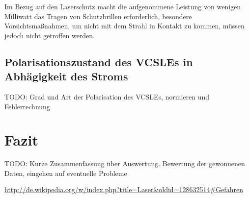 \documentclass[bigchapter,colorback,accentcolor=tud4b,linedtoc,11pt]{tudreport}
\begin{document}
Im Bezug auf den Laserschutz macht die aufgenommene Leistung von wenigen Milliwatt das Tragen von Schutzbrillen erforderlich, besondere Vorsichtsmaßnahmen, um nicht mit dem Strahl in Kontakt zu kommen, müssen jedoch nicht getroffen werden.

\section{Polarisationszustand des VCSLEs in Abhägigkeit des Stroms}
TODO: Grad und Art der Polarisation des VCSLEs, normieren und Fehlerrechnung
\chapter{Fazit}
TODO: Kurze Zusammenfassung über Auswertung. Bewertung der gewonnenen Daten, eingehen auf eventuelle Probleme

\cleardoublepage{}
\newpage
\begin{thebibliography}{100}
   \url{http://de.wikipedia.org/w/index.php?title=Laser&oldid=128632514#Gefahren}
\end{thebibliography}

\cleardoublepage{}
\end{document}
